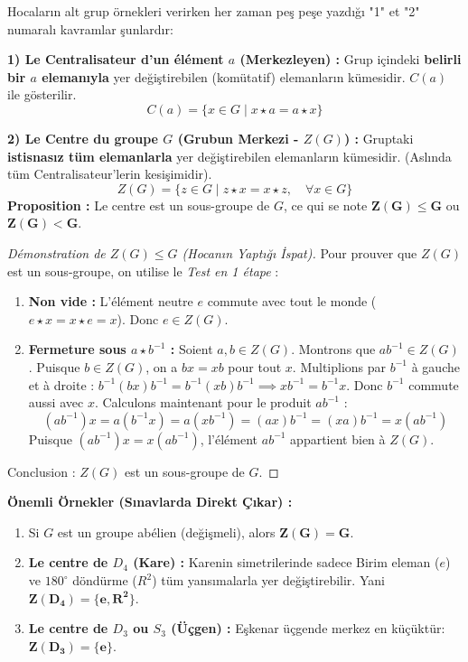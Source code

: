 \documentclass[12pt,a4paper]{report}
\begin{document}
\begin{tcolorbox}[colback=cyan!5!white,colframe=cyan!80!black,title=Proposition 5 : Centralisateur et Centre d'un Groupe]
Hocaların alt grup örnekleri verirken her zaman peş peşe yazdığı "1" et "2" numaralı kavramlar şunlardır:

\textbf{1) Le Centralisateur d'un élément $a$ (Merkezleyen) :} 
Grup içindeki \textbf{belirli bir $a$ elemanıyla} yer değiştirebilen (komütatif) elemanların kümesidir. $C(a)$ ile gösterilir.
\[ C(a) = \{ x \in G \mid x \star a = a \star x \} \]

\textbf{2) Le Centre du groupe $G$ (Grubun Merkezi - $Z(G)$) :} 
Gruptaki \textbf{istisnasız tüm elemanlarla} yer değiştirebilen elemanların kümesidir. (Aslında tüm Centralisateur'lerin kesişimidir).
\[ Z(G) = \{ z \in G \mid z \star x = x \star z, \quad \forall x \in G \} \]
\textbf{Proposition :} Le centre est un sous-groupe de $G$, ce qui se note $\mathbf{Z(G) \leq G}$ ou $\mathbf{Z(G) < G}$.

\begin{proof}[Démonstration de $Z(G) \leq G$ (Hocanın Yaptığı İspat)]
Pour prouver que $Z(G)$ est un sous-groupe, on utilise le \textit{Test en 1 étape} :
\begin{enumerate}
    \item \textbf{Non vide :} L'élément neutre $e$ commute avec tout le monde ($e \star x = x \star e = x$). Donc $e \in Z(G)$.
    \item \textbf{Fermeture sous $a \star b^{-1}$ :} Soient $a, b \in Z(G)$. Montrons que $ab^{-1} \in Z(G)$.
    Puisque $b \in Z(G)$, on a $bx = xb$ pour tout $x$. Multiplions par $b^{-1}$ à gauche et à droite : $b^{-1}(bx)b^{-1} = b^{-1}(xb)b^{-1} \implies xb^{-1} = b^{-1}x$. Donc $b^{-1}$ commute aussi avec $x$.
    Calculons maintenant pour le produit $ab^{-1}$ :
    \[ (ab^{-1})x = a(b^{-1}x) = a(xb^{-1}) = (ax)b^{-1} = (xa)b^{-1} = x(ab^{-1}) \]
    Puisque $(ab^{-1})x = x(ab^{-1})$, l'élément $ab^{-1}$ appartient bien à $Z(G)$.
\end{enumerate}
Conclusion : $Z(G)$ est un sous-groupe de $G$.
\end{proof}

\textbf{Önemli Örnekler (Sınavlarda Direkt Çıkar) :}
\begin{enumerate}
    \item Si $G$ est un groupe abélien (değişmeli), alors $\mathbf{Z(G) = G}$.
    \item \textbf{Le centre de $D_4$ (Kare) :} Karenin simetrilerinde sadece Birim eleman ($e$) ve $180^\circ$ döndürme ($R^2$) tüm yansımalarla yer değiştirebilir. Yani $\mathbf{Z(D_4) = \{e, R^2\}}$.
    \item \textbf{Le centre de $D_3$ ou $S_3$ (Üçgen) :} Eşkenar üçgende merkez en küçüktür: $\mathbf{Z(D_3) = \{e\}}$.
\end{enumerate}
\end{tcolorbox}
\end{document}
